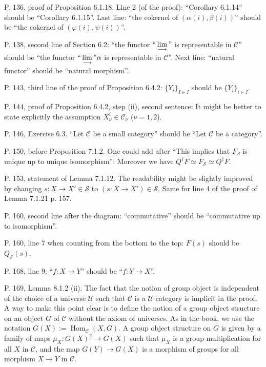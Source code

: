 \documentclass[12pt]{article}
\theoremstyle{remark}%
\newcommand{\n}{\noindent}
\newcommand{\C}{\mathcal C}
\newcommand{\SSS}{\mathcal S}
\newcommand{\U}{\mathcal U}
\newcommand{\p}{\varphi}
\DeclareMathOperator{\Hom}{Hom}
\begin{document}
\n P. 136, proof of Proposition 6.1.18. Line 2 (of the proof): ``Corollary 6.1.14'' should be ``Corollary 6.1.15''. Last line: ``the cokernel of $(\alpha(i),\beta(i))$'' should be ``the cokernel of $(\p(i),\psi(i))$''. 

\n P. 138, second line of Section 6.2: ``the functor $``\displaystyle\lim_{\longrightarrow}"$ is representable in $\C$'' should be ``the functor $``\displaystyle\lim_{\longrightarrow}"\alpha$ is representable in $\C$''. Next line: ``natural functor'' should be ``natural morphism''. 


\n P. 143, third line of the proof of Proposition 6.4.2: $\{Y_i\}_{I\in I}$ should be $\{Y_i\}_{i\in I}$. 

\n P. 144, proof of Proposition 6.4.2, step (ii), second sentence: It might be better to state explicitly the assumption $X_\nu^i\in\C_\nu$ ($\nu=1,2$). 

\n P. 146, Exercise 6.3. ``Let $\C$ be a small category'' should be ``Let $\C$ be a category''. 

\n P. 150, before Proposition 7.1.2. One could add after ``This implies that $F_{\SSS}$ is unique up to unique isomorphism'': Moreover we have $Q^\dagger F\simeq F_{\SSS}\simeq Q^\ddagger F$. 

\n P. 153, statement of Lemma 7.1.12. The readability might be slightly improved by changing $s:X\to X'\in\mathcal S$ to $(s:X\to X')\in\mathcal S$. Same for line 4 of the proof of Lemma 7.1.21 p. 157.  

\n P. 160, second line after the diagram: ``commutative'' should be ``commutative up to isomorphism''.

\n P. 160, line 7 when counting from the bottom to the top: $F(s)$ should be $Q_{\mathcal S}(s)$. 

\n P. 168, line 9: ``$f:X\to Y$'' should be ``$f:Y\to X$''. 

\n P. 169, Lemma 8.1.2 (ii). The fact that the notion of group object is independent of the choice of a universe $\U$ such that $\C$ is a $\U$-category is implicit in the proof. A way to make this point clear is to define the notion of a group object structure on an object $G$ of $\C$ without the axiom of universes. As in the book, we use the notation $G(X):=\Hom_\C(X,G)$. A group object structure on $G$ is given by a family of maps $\mu_X:G(X)^2\to G(X)$ such that $\mu_X$ is a group multiplication for all $X$ in $\C$, and the map $G(Y)\to G(X)$ is a morphism of groups for all morphism $X\to Y$ in $\C$. 
\end{document}
